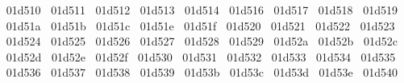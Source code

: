 {  ^^^^^^01d510%
  ^^^^^^01d511%
  ^^^^^^01d512%
  ^^^^^^01d513%
  ^^^^^^01d514%
  ^^^^^^01d516%
  ^^^^^^01d517%
  ^^^^^^01d518%
  ^^^^^^01d519%
  ^^^^^^01d51a%
  ^^^^^^01d51b%
  ^^^^^^01d51c%
  ^^^^^^01d51e%
  ^^^^^^01d51f%
  ^^^^^^01d520%
  ^^^^^^01d521%
  ^^^^^^01d522%
  ^^^^^^01d523%
  ^^^^^^01d524%
  ^^^^^^01d525%
  ^^^^^^01d526%
  ^^^^^^01d527%
  ^^^^^^01d528%
  ^^^^^^01d529%
  ^^^^^^01d52a%
  ^^^^^^01d52b%
  ^^^^^^01d52c%
  ^^^^^^01d52d%
  ^^^^^^01d52e%
  ^^^^^^01d52f%
  ^^^^^^01d530%
  ^^^^^^01d531%
  ^^^^^^01d532%
  ^^^^^^01d533%
  ^^^^^^01d534%
  ^^^^^^01d535%
  ^^^^^^01d536%
  ^^^^^^01d537%
  ^^^^^^01d538%
  ^^^^^^01d539%
  ^^^^^^01d53b%
  ^^^^^^01d53c%
  ^^^^^^01d53d%
  ^^^^^^01d53e%
  ^^^^^^01d540%
}
